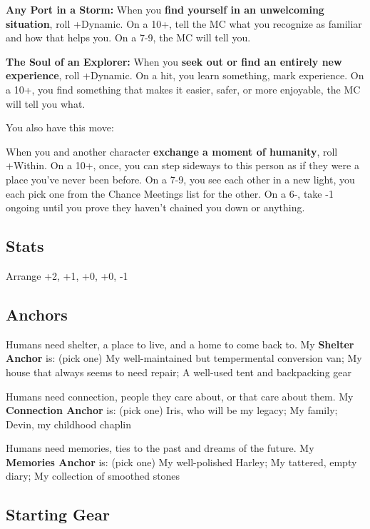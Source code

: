 \documentclass[
  oneside,
  statementpaper,
  9pt]{memoir}
\begin{document}
\textbf{Any Port in a Storm:} When you \textbf{find yourself in an
unwelcoming situation}, roll +Dynamic. On a 10+, tell the MC what you
recognize as familiar and how that helps you. On a 7-9, the MC will tell
you.

\textbf{The Soul of an Explorer:} When you \textbf{seek out or find an
entirely new experience}, roll +Dynamic. On a hit, you learn something,
mark experience. On a 10+, you find something that makes it easier,
safer, or more enjoyable, the MC will tell you what.

You also have this move:

When you and another character \textbf{exchange a moment of humanity},
roll +Within. On a 10+, once, you can step sideways to this person as if
they were a place you've never been before. On a 7-9, you see each other
in a new light, you each pick one from the Chance Meetings list for the
other. On a 6-, take -1 ongoing until you prove they haven't chained you
down or anything.

\hypertarget{stats-9}{%
\subsection{Stats}\label{stats-9}}

Arrange +2, +1, +0, +0, -1

\hypertarget{anchors-8}{%
\subsection{Anchors}\label{anchors-8}}

Humans need shelter, a place to live, and a home to come back to. My
\textbf{Shelter Anchor} is: (pick one) My well-maintained but
tempermental conversion van; My house that always seems to need repair;
A well-used tent and backpacking gear

Humans need connection, people they care about, or that care about them.
My \textbf{Connection Anchor} is: (pick one) Iris, who will be my
legacy; My family; Devin, my childhood chaplin

Humans need memories, ties to the past and dreams of the future. My
\textbf{Memories Anchor} is: (pick one) My well-polished Harley; My
tattered, empty diary; My collection of smoothed stones

\hypertarget{starting-gear-8}{%
\subsection{Starting Gear}\label{starting-gear-8}}
\end{document}
